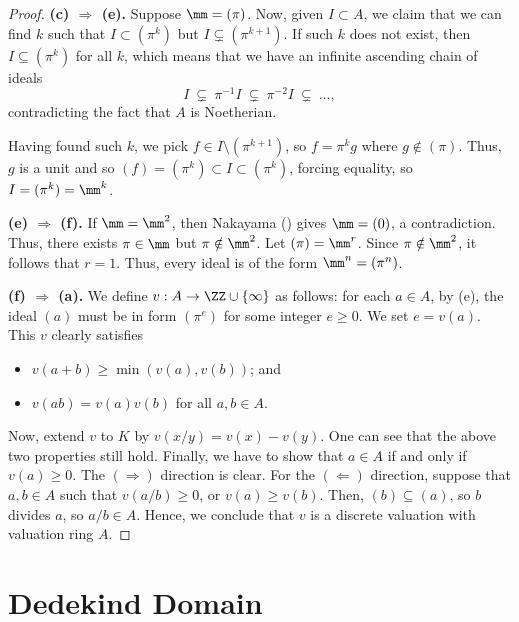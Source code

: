 \begin{proof}
    \textbf{(c) $\Rightarrow$ (e).}
    Suppose $\mm=(\pi)$.
    Now, given $I\subset A$, we claim that we can find $k$ such that $I\subset (\pi^k)$
    but $I\subsetneq (\pi^{k+1})$.
    If such $k$ does not exist, then $I\subseteq (\pi^k)$
    for all $k$, which means that we have an infinite ascending chain of ideals
    $$I\ \subsetneq\ \pi^{-1}I\ \subsetneq\ \pi^{-2}I\ \subsetneq\  \dots,$$
    contradicting the fact that $A$ is Noetherian.
    
    Having found such $k$, we 
    pick $f\in I\setminus (\pi^{k+1})$, so $f=\pi^kg$
    where $g\notin (\pi)$.
    Thus, $g$ is a unit and so $(f)=(\pi^k)\subset I
    \subset (\pi^k)$, forcing equality,
    so $I=(\pi^k)=\mm^k$.

    \textbf{(e) $\Rightarrow$ (f).}
    If $\mm=\mm^2$, then Nakayama ()
    gives $\mm=(0)$, a contradiction.
    Thus, there exists $\pi\in\mm$ but $\pi\notin\mm^2$.
    Let $(\pi) = \mm^r$. Since $\pi\notin\mm^2$, it follows that $r=1$.
    Thus, every ideal is of the form $\mm^n = (\pi^n)$.
    
    \textbf{(f) $\Rightarrow$ (a).}
    We define $v : A\to\ZZ\cup\{\infty\}$ as follows:
    for each $a\in A$, by (e), the ideal $(a)$ must be in form
    $(\pi^e)$ for some integer $e\geq 0$.
    We set $e=v(a)$.
    This $v$ clearly satisfies
    \begin{itemize}
        \item $v(a+b) \geq \min(v(a), v(b))$; and
        \item $v(ab) = v(a)v(b)$ for all $a,b\in A$.
    \end{itemize}
    Now, extend $v$ to $K$ by $v(x/y) = v(x)-v(y)$.
    One can see that the above two properties still hold.
    Finally, we have to show that $a\in A$ if and only if $v(a)\geq 0$.
    The $(\Rightarrow)$ direction is clear.
    For the $(\Leftarrow)$ direction, suppose that 
    $a,b\in A$ such that $v(a/b)\geq 0$, or $v(a)\geq v(b)$.
    Then, $(b)\subseteq (a)$, so $b$ divides $a$, so $a/b\in A$.
    Hence, we conclude that $v$ is a discrete valuation
    with valuation ring $A$.
\end{proof}
%
%
%
%
%
%
\section{Dedekind Domain}
\label{sec:dedekind}
